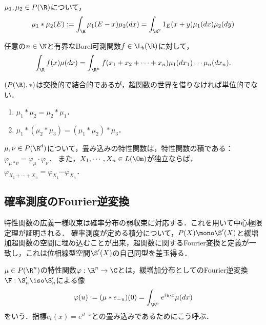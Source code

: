 \documentclass[uplatex,dvipdfmx]{jsreport}
\begin{document}
\begin{definition}
    $\mu_1,\mu_2\in P(\R)$について，
    \[\mu_1*\mu_2(E):=\int_{\R}\mu_1(E-x)\mu_2(dx)=\int_{\R^2}1_E(x+y)\mu_1(dx)\mu_2(dy)\]
\end{definition}

\begin{theorem}
    任意の$n\in\N$と有界なBorel可測関数$f\in\L_b(\R)$に対して，
    \[\int_\R f(x)\mu(dx)=\int_{\R^n}f(x_1+x_2+\cdots+x_n)\mu_1(dx_1)\cdots\mu_n(dx_n).\]
\end{theorem}

\begin{proposition}[測度の代数]
    $(P(\R),*)$は交換的で結合的であるが，超関数の世界を借りなければ単位的でない．
    \begin{enumerate}
        \item $\mu_1*\mu_2=\mu_2*\mu_1$．
        \item $\mu_1*(\mu_2*\mu_3)=(\mu_1*\mu_2)*\mu_3$．
    \end{enumerate}
\end{proposition}

\begin{theorem}[Fourier逆変換は代数の準同型である]
    $\mu,\nu\in P(\R^d)$について，畳み込みの特性関数は，特性関数の積である：$\varphi_{\mu*\nu}=\varphi_\mu\cdot\varphi_\nu$．
    また，$X_1,\cdots,X_n\in L(\Om)$が独立ならば，$\varphi_{X_1+\cdots+X_n}=\varphi_{X_1}\cdots\varphi_{X_n}$．
\end{theorem}

\subsection{確率測度のFourier逆変換}

\begin{tcolorbox}[colframe=ForestGreen, colback=ForestGreen!10!white,breakable,colbacktitle=ForestGreen!40!white,coltitle=black,fonttitle=\bfseries\sffamily,
title=]
    特性関数の広義一様収束は確率分布の弱収束に対応する．これを用いて中心極限定理が証明される．
    確率測度が定める積分について，$P(X)\mono\S'(X)$と緩増加超関数の空間に埋め込むことが出来，超関数に関するFourier変換と定義が一致し，これは位相線型空間$\S'(X)$の自己同型を差玉得る．
\end{tcolorbox}

\begin{definition}
    $\mu\in P(\R^n)$の特性関数$\varphi:\R^n\to\C$とは，緩増加分布としてのFourier逆変換$\F:\S'_n\iso\S'_n$による像
    \[\varphi(u):=(\mu*e_{-u})(0)=\int_{\R^n} e^{iu\cdot x}\mu(dx)\]
    をいう．指標$e_t(x)=e^{it\cdot x}$との畳み込みであるためにこう呼ぶ．
\end{definition}
\end{document}

